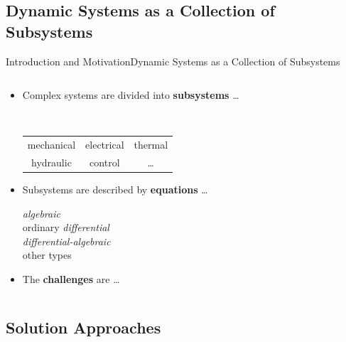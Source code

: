 \subsection{Dynamic Systems as a Collection of Subsystems}

\begin{frame}{Introduction and Motivation}{Dynamic Systems as a Collection of Subsystems}
  \begin{columns}
    \begin{column}[c]{0.6\textwidth}
      \begin{itemize}
        \item<1-> Complex systems are divided into \textbf{subsystems} \dots \\
        \begin{small}
          \quad\, \begin{tabular}{ccc}
            mechanical & electrical & thermal \\
            hydraulic & control & \dots
          \end{tabular}
        \end{small}
        \item<3-> Subsystems are described by \textbf{equations} \dots \\
        \begin{small}
          \qquad \emph{algebraic} \\
          \qquad ordinary \emph{differential} \\
          \qquad \emph{differential-algebraic} \\
          \qquad other types
        \end{small}
        \item<4-> The \textbf{challenges} are \dots {}
      \end{itemize}
    \end{column}
    \begin{column}[c]{0.4\textwidth}
      \centering
    \end{column}
  \end{columns}
\end{frame}

\subsection{Solution Approaches}

